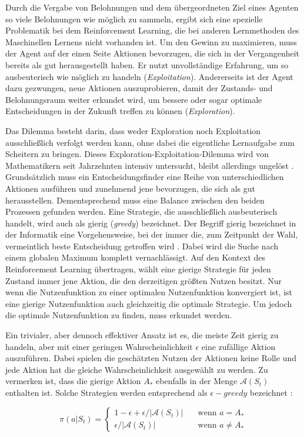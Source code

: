 Durch die Vergabe von Belohnungen und dem übergeordneten Ziel eines Agenten so viele Belohnungen wie möglich zu sammeln, ergibt sich eine spezielle Problematik bei dem Reinforcement Learning, die bei anderen Lernmethoden des Maschinellen Lernens nicht vorhanden ist. Um den Gewinn zu maximieren, muss der Agent auf der einen Seite Aktionen bevorzugen, die sich in der Vergangenheit bereits als gut herausgestellt haben. Er nutzt unvollständige Erfahrung, um so ausbeuterisch wie möglich zu handeln (\textit{Exploitation}). Andererseits ist der Agent dazu gezwungen, neue Aktionen auszuprobieren, damit der Zustands- und Belohnungsraum weiter erkundet wird, um bessere oder sogar optimale Entscheidungen in der Zukunft treffen zu können (\textit{Exploration}). 
\par 
Das Dilemma besteht darin, dass weder Exploration noch Exploitation ausschließlich verfolgt werden kann, ohne dabei die eigentliche Lernaufgabe zum Scheitern zu bringen. Dieses Exploration-Exploitation-Dilemma wird von Mathematikern seit Jahrzehnten intensiv untersucht, bleibt allerdings ungelöst \cite[S.~3]{Sutton1998}. Grundsätzlich muss ein Entscheidungsfinder  eine Reihe von unterschiedlichen Aktionen ausführen und zunehmend jene bevorzugen, die sich als gut herausstellen. Dementsprechend muss eine Balance zwischen den beiden Prozessen gefunden werden.
Eine Strategie, die ausschließlich ausbeuterisch handelt, wird auch als gierig (\textit{greedy}) bezeichnet. Der Begriff \glqq gierig\grqq{} bezeichnet in der Informatik eine Vorgehensweise, bei der immer die, zum Zeitpunkt der Wahl, vermeintlich beste Entscheidung getroffen wird \cite[S.~203]{greedy}. Dabei wird die Suche nach einem globalen Maximum komplett vernachlässigt. Auf den Kontext des Reinforcement Learning übertragen, wählt eine gierige Strategie für jeden Zustand immer jene Aktion, die den derzeitigen größten Nutzen besitzt. Nur wenn die Nutzenfunktion zu einer optimalen Nutzenfunktion konvergiert ist, ist eine gierige Nutzenfunktion auch gleichzeitig die optimale Strategie. Um jedoch die optimale Nutzenfunktion zu finden, muss erkundet werden.
\par
Ein trivialer, aber dennoch effektiver Ansatz ist es, die meiste Zeit gierig zu handeln, aber mit einer geringen Wahrscheinlichkeit $\epsilon$ eine zufällige Aktion auszuführen. Dabei spielen die geschätzten Nutzen der Aktionen keine Rolle und jede Aktion hat die gleiche Wahrscheinlichkeit ausgewählt zu werden. Zu vermerken ist, dass die gierige Aktion $A_*$ ebenfalls in der Menge $\mathcal{A}(S_t)$ enthalten ist. Solche Strategien werden entsprechend als $\epsilon-greedy$ bezeichnet \cite[S.~28]{Sutton1998}:

\begin{equation}\label{eq:greedyProbs}
    \pi(a|S_t) =   
        \begin{cases}
            1-\epsilon + \epsilon / |\mathcal{A}(S_t)|      & \quad \text{wenn } a = A_* \\
            \epsilon / |\mathcal{A}(S_t)|  & \quad \text{wenn } a \neq A_*
        \end{cases}
\end{equation}